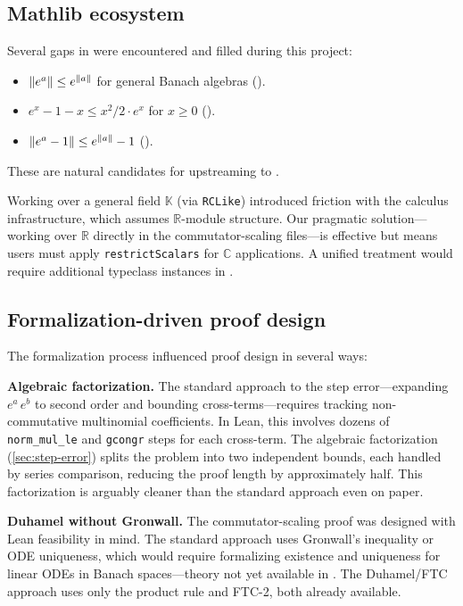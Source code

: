 \subsection{Mathlib ecosystem}
\label{sec:mathlib}

Several gaps in \Mathlib were encountered and filled during this project:
\begin{itemize}
  \item $\left\|e^a\right\| \le e^{\left\|a\right\|}$ for general Banach algebras
    ().
  \item $e^x - 1 - x \le x^2/2 \cdot e^x$ for $x \ge 0$
    ().
  \item $\left\|e^a - 1\right\| \le e^{\left\|a\right\|} - 1$
    ().
\end{itemize}
These are natural candidates for upstreaming to \Mathlib.

Working over a general field $\mathbb{K}$ (via \texttt{RCLike}) introduced
friction with the calculus infrastructure, which assumes $\mathbb{R}$-module
structure. Our pragmatic solution---working over $\mathbb{R}$ directly in the
commutator-scaling files---is effective but means users must apply
\texttt{restrictScalars} for $\mathbb{C}$ applications. A unified treatment
would require additional typeclass instances in \Mathlib.

\subsection{Formalization-driven proof design}
\label{sec:formalization-insights}

The formalization process influenced proof design in several ways:

\textbf{Algebraic factorization.}
The standard approach to the step error---expanding $e^a\,e^b$ to second order
and bounding cross-terms---requires tracking non-commutative multinomial
coefficients. In Lean, this involves dozens of \texttt{norm\_mul\_le} and
\texttt{gcongr} steps for each cross-term. The algebraic factorization
(\cref{sec:step-error}) splits the problem into two independent bounds,
each handled by series comparison, reducing the proof length by approximately
half. This factorization is arguably cleaner than the standard approach even
on paper.

\textbf{Duhamel without Gronwall.}
The commutator-scaling proof was designed with Lean feasibility in mind.
The standard approach uses Gronwall's inequality or ODE uniqueness, which
would require formalizing existence and uniqueness for linear ODEs in
Banach spaces---theory not yet available in \Mathlib. The Duhamel/FTC approach
uses only the product rule and FTC-2, both already available.

